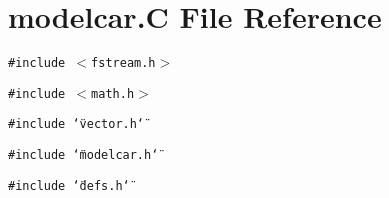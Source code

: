\section{modelcar.C File Reference}
\label{modelcar_8C}
{\tt \#include $<$fstream.h$>$}\par
{\tt \#include $<$math.h$>$}\par
{\tt \#include \char`\"{}vector.h\char`\"{}}\par
{\tt \#include \char`\"{}modelcar.h\char`\"{}}\par
{\tt \#include \char`\"{}defs.h\char`\"{}}\par
